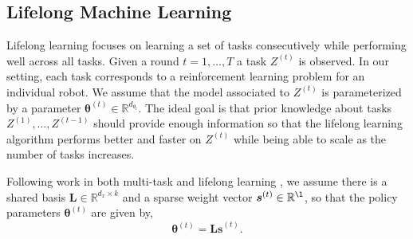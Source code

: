 \documentclass{aamas2016}
\renewcommand{\Re}{\mathbb{R}}
\newcommand{\note}[3]{{\color{#2} [ \ding{42} \textbf{#1:} {\small #3} ]}}
\newcommand{\comEric}[1]{\note{Eric}{blue}{#1}}
\begin{document}
\subsection{Lifelong Machine Learning}


Lifelong learning focuses on learning a set of tasks consecutively while performing well across all tasks. Given a round $t = 1,\dots,T$ a task $Z^{(t)}$ is observed. %
In our setting, each task corresponds to a reinforcement learning problem for an individual robot. We assume that the model associated to $Z^{(t)}$ is parameterized by a parameter $\boldsymbol{\theta}^{(t)} \in \Re^{d_{\theta_{t}}}$. The ideal goal is that prior knowledge about tasks $Z^{(1)},\ldots,Z^{(t-1)}$ should provide enough information so that the lifelong learning algorithm performs better and faster on $Z^{(t)}$ while being able to scale as the number of tasks increases.

Following work in both multi-task \cite{Kumar-2012} and lifelong learning \cite{Ruvolo2013}, we assume there is a shared basis $\boldsymbol{L}\in \Re^{d_{x}\times k}$ and a sparse weight vector $\boldsymbol{s}^{(t)}\in \Re^{\l}$, so that the policy parameters $\boldsymbol{\theta}^{(t)}$
are given by,
\begin{displaymath}
 \boldsymbol{\theta}^{(t)}=\boldsymbol{Ls}^{(t)}.
\end{displaymath}
\end{document}
